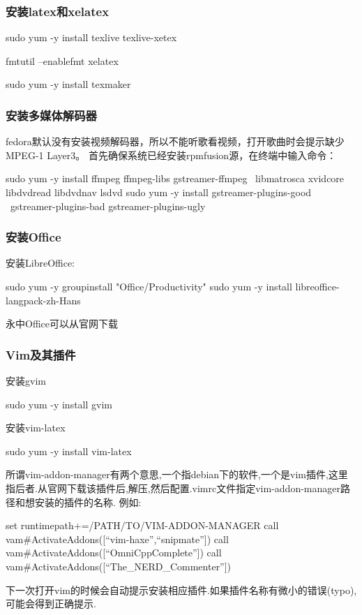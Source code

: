 \subsubsection{安装latex和xelatex}
\begin{shellcmd}
sudo yum -y install texlive texlive-xetex

fmtutil --enablefmt xelatex

sudo yum -y install texmaker
\end{shellcmd}
\subsubsection{安装多媒体解码器}
fedora默认没有安装视频解码器，所以不能听歌看视频，打开歌曲时会提示缺少MPEG-1 Layer3。
首先确保系统已经安装rpmfusion源，在终端中输入命令：
\begin{shellcmd}
sudo yum -y install ffmpeg ffmpeg-libs gstreamer-ffmpeg \
libmatrosca xvidcore libdvdread libdvdnav lsdvd
sudo yum -y install gstreamer-plugins-good \ 
gstreamer-plugins-bad gstreamer-plugins-ugly
\end{shellcmd}

\subsubsection{安装Office}
安装LibreOffice:
\begin{shellcmd}
sudo yum -y groupinstall "Office/Productivity"
sudo yum -y install libreoffice-langpack-zh-Hans
\end{shellcmd}
永中Office可以从官网下载

\subsubsection{Vim及其插件}
安装gvim
\begin{shellcmd}
sudo yum -y install gvim
\end{shellcmd}
安装vim-latex
\begin{shellcmd}
sudo yum -y install vim-latex
\end{shellcmd}
所谓vim-addon-manager有两个意思,一个指debian下的软件,一个是vim插件,这里指后者.从官网下载该插件后,解压,然后配置.vimrc文件指定vim-addon-manager路径和想安装的插件的名称.
例如:
\begin{shellcmd}
set runtimepath+=/PATH/TO/VIM-ADDON-MANAGER
call vam#ActivateAddons([``vim-haxe'',``snipmate''])
call vam#ActivateAddons([``OmniCppComplete''])
call vam#ActivateAddons([``The_NERD_Commenter''])
\end{shellcmd}
下一次打开vim的时候会自动提示安装相应插件.如果插件名称有微小的错误(typo),可能会得到正确提示.

